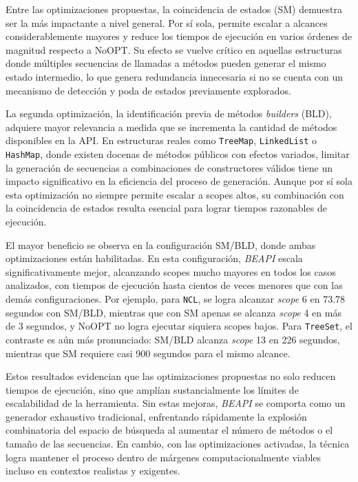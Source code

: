 Entre las optimizaciones propuestas, la coincidencia de estados (\textsf{SM}) demuestra ser la más 
impactante a nivel general. Por sí sola, permite escalar a alcances considerablemente mayores y reduce 
los tiempos de ejecución en varios órdenes de magnitud respecto a \textsf{NoOPT}. Su efecto se vuelve 
crítico en aquellas estructuras donde múltiples secuencias de llamadas a métodos pueden generar el mismo estado 
intermedio, lo que genera redundancia innecesaria si no se cuenta con un mecanismo de detección y poda 
de estados previamente explorados.

La segunda optimización, la identificación previa de métodos \emph{builders} (\textsf{BLD}), adquiere 
mayor relevancia a medida que se incrementa la cantidad de métodos disponibles en la API. En 
estructuras reales como \texttt{TreeMap}, \texttt{LinkedList} o \texttt{HashMap}, donde existen 
docenas de métodos públicos con efectos variados, limitar la generación de secuencias a combinaciones 
de constructores válidos tiene un impacto significativo en la eficiencia del proceso de generación. 
Aunque por sí sola esta optimización no siempre permite escalar a scopes altos, su combinación con la 
coincidencia de estados resulta esencial para lograr tiempos razonables de ejecución.

El mayor beneficio se observa en la configuración \textsf{SM/BLD}, donde ambas optimizaciones están 
habilitadas. En esta configuración, \emph{BEAPI} escala significativamente mejor, alcanzando scopes 
mucho mayores en todos los casos analizados, con tiempos de ejecución hasta cientos de veces menores 
que con las demás configuraciones. Por ejemplo, para \texttt{NCL}, se logra alcanzar \textit{scope} 6 
en 73.78 segundos con \textsf{SM/BLD}, mientras que con \textsf{SM} apenas se alcanza \textit{scope} 4 
en más de 3 segundos, y \textsf{NoOPT} no logra ejecutar siquiera scopes bajos. Para \texttt{TreeSet}, 
el contraste es aún más pronunciado: \textsf{SM/BLD} alcanza \textit{scope} 13 en 226 segundos, mientras 
que \textsf{SM} requiere casi 900 segundos para el mismo alcance.

Estos resultados evidencian que las optimizaciones propuestas no solo reducen tiempos de ejecución, 
sino que amplían sustancialmente los límites de escalabilidad de la herramienta. Sin estas mejoras, 
\emph{BEAPI} se comporta como un generador exhaustivo tradicional, enfrentando rápidamente la explosión 
combinatoria del espacio de búsqueda al aumentar el número de métodos o el tamaño de las secuencias. 
En cambio, con las optimizaciones activadas, la técnica logra mantener el proceso dentro de márgenes 
computacionalmente viables incluso en contextos realistas y exigentes.

